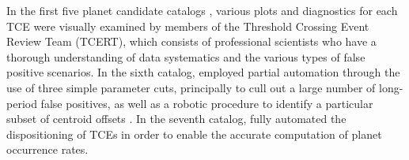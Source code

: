 \label{s:robovetter}
In the first five \Kepler{} planet candidate catalogs \citep{Borucki2011a,Borucki2011b,Batalha2013,Burke2014,Rowe2015a}, various plots and diagnostics for each TCE were visually examined by members of the Threshold Crossing Event Review Team (TCERT), which consists of professional scientists who have a thorough understanding of \kepler{} data systematics and the various types of false positive scenarios. In the sixth catalog, \citet{Mullally2015cat} employed partial automation through the use of three simple parameter cuts, principally to cull out a large number of long-period false positives, as well as a robotic procedure to identify a particular subset of centroid offsets \citep[see \S5.2 of][]{Mullally2015cat}. In the seventh catalog, \citet{Coughlin2016} fully automated the dispositioning of TCEs in order to enable the accurate computation of planet occurrence rates.


%  


%
%


